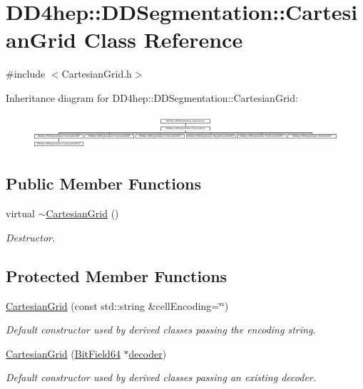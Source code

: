\hypertarget{class_d_d4hep_1_1_d_d_segmentation_1_1_cartesian_grid}{}\section{D\+D4hep\+:\+:D\+D\+Segmentation\+:\+:Cartesian\+Grid Class Reference}
\label{class_d_d4hep_1_1_d_d_segmentation_1_1_cartesian_grid}


{\ttfamily \#include $<$Cartesian\+Grid.\+h$>$}

Inheritance diagram for D\+D4hep\+:\+:D\+D\+Segmentation\+:\+:Cartesian\+Grid\+:\begin{figure}[H]
\begin{center}
\leavevmode
\includegraphics[height=1.269841cm]{class_d_d4hep_1_1_d_d_segmentation_1_1_cartesian_grid}
\end{center}
\end{figure}
\subsection*{Public Member Functions}
\begin{DoxyCompactItemize}
\item 
virtual \hyperlink{class_d_d4hep_1_1_d_d_segmentation_1_1_cartesian_grid_a47e47796738c185cae95da0beb464913}{$\sim$\+Cartesian\+Grid} ()
\begin{DoxyCompactList}\small\item\em Destructor. \end{DoxyCompactList}\end{DoxyCompactItemize}
\subsection*{Protected Member Functions}
\begin{DoxyCompactItemize}
\item 
\hyperlink{class_d_d4hep_1_1_d_d_segmentation_1_1_cartesian_grid_a12123b75c013fb62deb0877d923ba1e7}{Cartesian\+Grid} (const std\+::string \&cell\+Encoding=\char`\"{}\char`\"{})
\begin{DoxyCompactList}\small\item\em Default constructor used by derived classes passing the encoding string. \end{DoxyCompactList}\item 
\hyperlink{class_d_d4hep_1_1_d_d_segmentation_1_1_cartesian_grid_a5a6b4d64466513cabaaf38060b640be8}{Cartesian\+Grid} (\hyperlink{class_d_d4hep_1_1_d_d_segmentation_1_1_bit_field64}{Bit\+Field64} $\ast$\hyperlink{class_d_d4hep_1_1_d_d_segmentation_1_1_segmentation_abec3489982d0fe91ef4b142d9d755576}{decoder})
\begin{DoxyCompactList}\small\item\em Default constructor used by derived classes passing an existing decoder. \end{DoxyCompactList}\end{DoxyCompactItemize}

